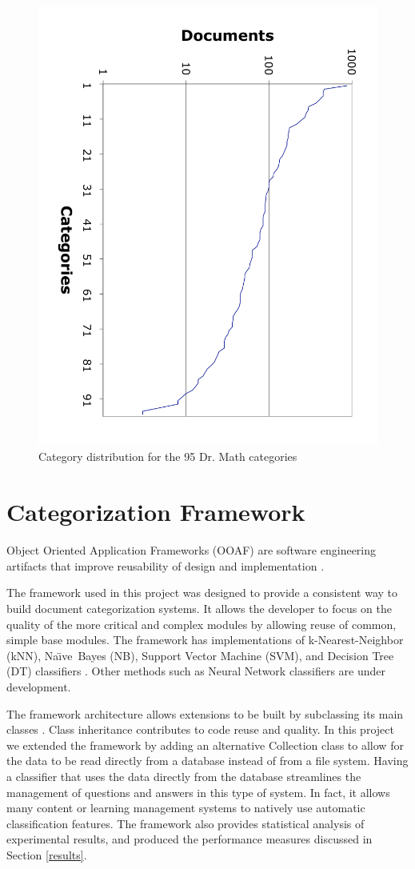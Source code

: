 \documentclass{article}
\newcommand{\naive}{Na\"\i ve}
\begin{document}
\begin{figure}
\includegraphics[angle=90,width=0.7\linewidth]{cat-distribution}
\caption{Category distribution for the 95 Dr. Math categories}
\label{cat-distribution}
\end{figure}


\section{Categorization Framework}

Object Oriented Application Frameworks (OOAF) are software engineering artifacts 
that improve reusability of design and implementation \cite{fayad:97, fayad:99}.

The framework used in this project was designed to provide a
consistent way to build document categorization
systems.\cite{williams:02} It allows the developer to focus on the
quality of the more critical and complex modules by allowing reuse of
common, simple base modules.  The framework has
implementations of 
k-Nearest-Neighbor (kNN), \naive\ Bayes (NB), Support Vector Machine (SVM), and
Decision Tree (DT) classifiers \cite{yang:99, sebastiani:02}. Other methods
such as Neural Network \cite{calvo:00, calvo:01} classifiers are under development.

The framework architecture allows extensions to be built by subclassing
its main classes \cite{williams:02}. Class inheritance contributes to code reuse and 
quality.
In this project we extended the framework by adding an alternative
Collection class to allow for the data to be read directly from a database instead of from a file system.  
Having a classifier that uses the data directly from the database
streamlines the management of questions and answers in this type of
system. In fact, it allows many content or learning management systems
to natively use automatic classification features.
The framework also provides statistical analysis of experimental results, and 
produced the performance measures discussed in Section \ref{results}.
\end{document}
